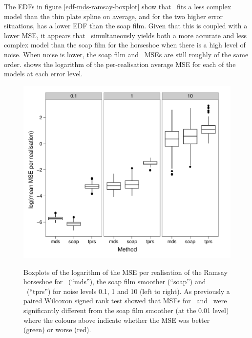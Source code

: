 The EDFs in figure \ref{edf-mds-ramsay-boxplot} show that \mdsap\ fits a less complex model than the thin plate spline on average, and for the two higher error situations, has a lower EDF than the soap film. Given that this is coupled with a lower MSE, it appears that \mdsap\ simultaneously yields both a more accurate and less complex model than the soap film for the horseshoe when there is a high level of noise. When noise is lower, the soap film and \mdsap\ MSEs are still roughly of the same order.  shows the logarithm of the per-realisation average MSE for each of the models at each error level.

\begin{figure}
\centering
\includegraphics[width=6in]{mds/figs/mds-ramsay-boxplot.pdf} \\
\caption{Boxplots of the logarithm of the MSE per realisation of the Ramsay horseshoe for \mdsap\ (``mds''), the soap film smoother (``soap'') and \tprs\ (``tprs'') for noise levels 0.1, 1 and 10 (left to right). As previously a paired Wilcoxon signed rank test showed that MSEs for \mdsap\ and \tprs\ were significantly different from the soap film smoother (at the 0.01 level) where the colours above indicate whether the MSE was better (green) or worse (red).}
\label{mds-ramsay-boxplot}
\end{figure}

